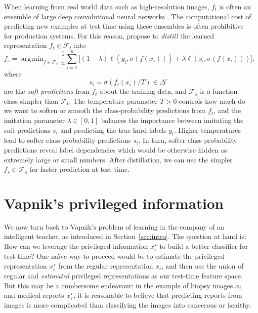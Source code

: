 \documentclass{article}
\DeclareMathOperator*{\argmin}{arg\,min}
\newcommand{\softmax}{\sigma}
\begin{document}
  When learning from real world data such as high-resolution images, $f_t$ is
  often an ensemble of large deep convolutional neural networks
  \citep{Lecun98}.  The computational cost of predicting new examples at test
  time using these ensembles is often prohibitive for production systems.  For
  this reason, \citet{Hinton15} propose to \emph{distill} the
  learned representation $f_t \in \mathcal{F}_t$ into
  \begin{equation}\label{eq:obj2}
    f_s = \argmin_{f\in \mathcal{F}_s} \frac{1}{n} \sum_{i=1}^n \Big[(1-\lambda)\ell(y_i,
    \softmax({f}(x_i))) + \lambda \ell(s_i,
    \softmax({f}(x_i)))\Big],
  \end{equation}
  where
  \begin{equation}\label{eq:soft}
    s_i = \softmax(f_t(x_i)/T) \in \Delta^c
  \end{equation}   
  are the \emph{soft predictions} from $f_t$ about the training data, and
  $\mathcal{F}_s$ is a function class  simpler than $\mathcal{F}_t$. The
  temperature parameter $T > 0$ controls how much do we want to soften or
  smooth the class-probability predictions from $f_t$, and the imitation
  parameter $\lambda \in [0,1]$ balances the importance between imitating the
  soft predictions $s_i$ and predicting the true hard labels $y_i$. Higher
  temperatures lead to softer class-probability predictions $s_i$. In turn,
  softer class-probability predictions reveal label dependencies which would be
  otherwise hidden as extremely large or small numbers. After distillation, we
  can use the simpler ${f_s} \in \mathcal{F}_s$ for faster prediction at test
  time.
  
\section{Vapnik's privileged information}
We now turn back to Vapnik's problem of learning in the company of an
intelligent teacher, as introduced in Section~\ref{sec:intro}. The question at
hand is: How can we leverage the privileged information $x^\star_i$ to build a
better classifier for test time?  One na\"ive way to proceed would be to estimate the
privileged representation $x^\star_i$ from the regular representation $x_i$, and then use
the union of regular and \emph{estimated} privileged representations as our
test-time feature space.  But this may be a cumbersome endeavour: in the
example of biopsy images $x_i$ and medical reports $x^\star_i$, it is
reasonable to believe that predicting reports from images is more
complicated than classifying the images into cancerous or healthy.
\end{document}
